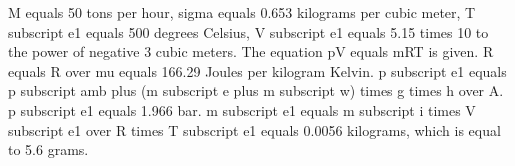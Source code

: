 M equals 50 tons per hour, sigma equals 0.653 kilograms per cubic meter, T subscript e1 equals 500 degrees Celsius, V subscript e1 equals 5.15 times 10 to the power of negative 3 cubic meters. The equation pV equals mRT is given. R equals R over mu equals 166.29 Joules per kilogram Kelvin. p subscript e1 equals p subscript amb plus (m subscript e plus m subscript w) times g times h over A. p subscript e1 equals 1.966 bar. m subscript e1 equals m subscript i times V subscript e1 over R times T subscript e1 equals 0.0056 kilograms, which is equal to 5.6 grams.